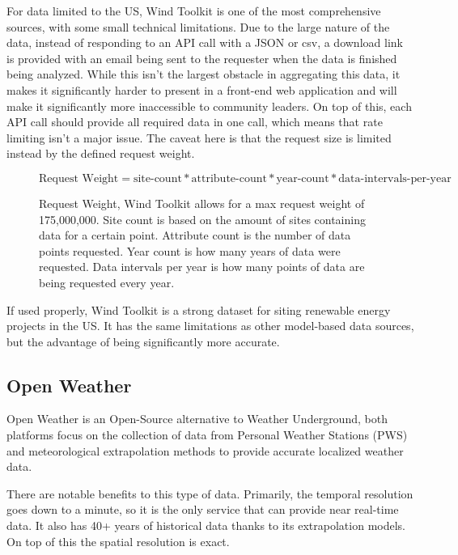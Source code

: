\documentclass[12pt, oneside]{article}   	%
\begin{document}
For data limited to the US, Wind Toolkit is one of the most comprehensive
sources, with some small technical limitations. Due to the large nature of the
data, instead of responding to an API call with a JSON or csv, a download link
is provided with an email being sent to the requester when the data is finished
being analyzed. While this isn't the largest obstacle in aggregating this data,
it makes it significantly harder to present in a front-end web application and
will make it significantly more inaccessible to community leaders. On top of
this, each API call should provide all required data in one call, which means
that rate limiting isn't a major issue. The caveat here is that the request size
is limited instead by the defined request weight.

\begin{figure}[h]
	\[\text{Request Weight}=\text{site-count}*\text{attribute-count}*\text{year-count}*\text{data-intervals-per-year} \]
	\caption[Wind Toolkit Request Weight Equation]{Request Weight, Wind Toolkit allows for a max request weight of 175,000,000. Site count is based on the amount of sites containing data for a certain point. Attribute count is the number of data points requested. Year count is how many years of data were requested. Data intervals per year is how many points of data are being requested every year.}
\end{figure}

If used properly, Wind Toolkit is a strong dataset for siting renewable energy
projects in the US. It has the same limitations as other model-based data
sources, but the advantage of being significantly more accurate.

\subsection{Open Weather}
Open Weather is an Open-Source alternative to Weather Underground, both
platforms focus on the collection of data from Personal Weather Stations (PWS)
and meteorological extrapolation methods to provide accurate localized weather
data.

There are notable benefits to this type of data. Primarily, the temporal
resolution goes down to a minute, so it is the only service that can provide
near real-time data. It also has 40+ years of historical data thanks to its
extrapolation models. On top of this the spatial resolution is exact.
\end{document}
